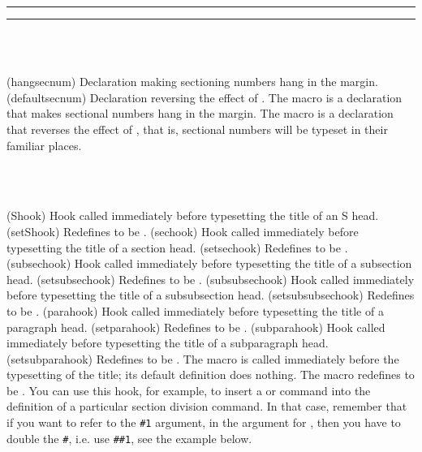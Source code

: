 \fancybreak{$*$}
\fancybreak{}

\begin{syntax}
\cmd{\hangsecnum} \\
 \\
\end{syntax}
\glossary(hangsecnum)%
  {}%
  {Declaration making sectioning numbers hang in the margin.}
\glossary(defaultsecnum)%
  {}%
  {Declaration reversing the effect of .}
The macro \cmd{\hangsecnum} is a declaration that makes sectional numbers hang
in the margin. The macro  is a declaration that reverses the
effect of \cmd{\hangsecnum}, that is, sectional numbers will be typeset in 
their familiar places.


\begin{syntax}
\cmd{\Shook} \\
\cmd{\setShook} \\
\end{syntax}
\glossary(Shook)%
  {}%
  {Hook called immediately before typesetting the title of an S head.}
\glossary(setShook)%
  {}%
  {Redefines  to be .}
\glossary(sechook)%
  {}%
  {Hook called immediately before typesetting the title of a section head.}
\glossary(setsechook)%
  {}%
  {Redefines  to be .}
\glossary(subsechook)%
  {}%
  {Hook called immediately before typesetting the title of a subsection head.}
\glossary(setsubsechook)%
  {}%
  {Redefines  to be .}
\glossary(subsubsechook)%
  {}%
  {Hook called immediately before typesetting the title of a subsubsection head.}
\glossary(setsubsubsechook)%
  {}%
  {Redefines  to be .}
\glossary(parahook)%
  {}%
  {Hook called immediately before typesetting the title of a paragraph head.}
\glossary(setparahook)%
  {}%
  {Redefines  to be .}
\glossary(subparahook)%
  {}%
  {Hook called immediately before typesetting the title of a subparagraph head.}
\glossary(setsubparahook)%
  {}%
  {Redefines  to be .}
The macro \cmd{\Shook} is called immediately before the typesetting of the
title; its default definition does nothing. The macro \cmd{\setShook} 
redefines \cmd{\Shook} to be . You can use this hook, for example,
to insert a \cmd{\sethangfrom} or \cmd{\setsecnumformat} command into the
definition of a particular section division command. In that case,
remember that if you want to refer to the \verb|#1| argument, in the
argument for \cmd{\setsecnumformat}, then you have to double the
\verb|#|, i.e. use \verb|##1|, see the example below.

